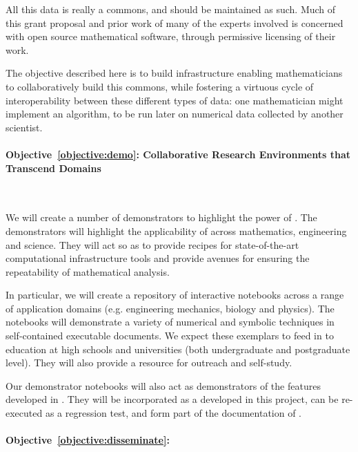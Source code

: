 \documentclass[noworkareas,deliverables,keys]{euproposal}                  %
\begin{document}
\begin{proposal}
All this data is really a commons, and should be maintained as such. Much of this grant proposal and prior work of many of the experts involved is concerned with open source mathematical software, through permissive licensing of their work. 

The objective described here is to build infrastructure enabling mathematicians to collaboratively build this commons, while fostering a virtuous cycle of interoperability between these different types of data: one mathematician might implement an algorithm, to be run later on numerical data collected by another scientist. 

\paragraph{Objective~\ref{objective:demo}: Collaborative Research Environments that Transcend Domains}\ 


We will create a number of demonstrators to highlight the power of
\TheProject{}. The demonstrators will highlight the applicability of
\TheProject{} across mathematics, engineering and science. They will
act so as to provide recipes for state-of-the-art computational
infrastructure tools and provide avenues for ensuring the
repeatability of mathematical analysis.

In particular, we will create a repository of interactive notebooks
across a range of application domains (e.g. engineering mechanics,
biology and physics). The notebooks will demonstrate a variety of
numerical and symbolic techniques in self-contained executable
documents. We expect these exemplars to feed in to education at high
schools and universities (both undergraduate and postgraduate
level). They will also provide a resource for outreach and self-study. 

Our demonstrator notebooks will also act as demonstrators of the
features developed in \TheProject. They will be incorporated as a
developed in this project, can be re-executed as a regression test,
and form part of the documentation of \TheProject.



\paragraph{Objective~\ref{objective:disseminate}: }\ 


\end{proposal}
\end{document}

